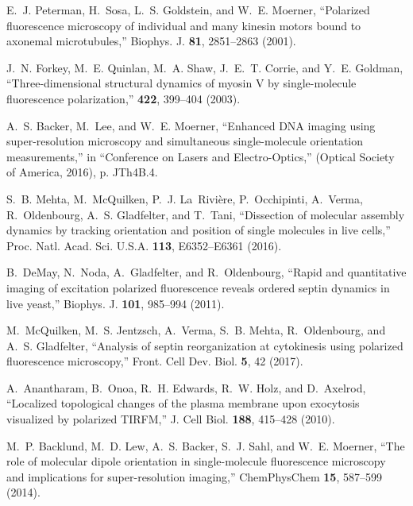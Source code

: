 \documentclass[10pt]{article}
\begin{document}
\begin{thebibliography}{10}
\newcommand{\enquote}[1]{``#1''}

E.~J. Peterman, H.~Sosa, L.~S. Goldstein, and W.~E. Moerner, \enquote{Polarized
  fluorescence microscopy of individual and many kinesin motors bound to
  axonemal microtubules,} Biophys. J. \textbf{81}, 2851--2863 (2001).

J.~N. Forkey, M.~E. Quinlan, M.~A. Shaw, J.~E.~T. Corrie, and Y.~E. Goldman,
  \enquote{Three-dimensional structural dynamics of myosin {V} by
  single-molecule fluorescence polarization,} \nat \textbf{422}, 399--404
  (2003).

A.~S. Backer, M.~Lee, and W.~E. Moerner, \enquote{Enhanced {DNA} imaging using
  super-resolution microscopy and simultaneous single-molecule orientation
  measurements,} in \enquote{Conference on Lasers and Electro-Optics,}
  (Optical Society of America, 2016), p. JTh4B.4.

S.~B. Mehta, M.~McQuilken, P.~J. La~Rivi\`ere, P.~Occhipinti, A.~Verma,
  R.~Oldenbourg, A.~S. Gladfelter, and T.~Tani, \enquote{Dissection of
  molecular assembly dynamics by tracking orientation and position of single
  molecules in live cells,} Proc. Natl. Acad. Sci. U.S.A. \textbf{113},
  E6352--E6361 (2016).

B.~DeMay, N.~Noda, A.~Gladfelter, and R.~Oldenbourg, \enquote{Rapid and
  quantitative imaging of excitation polarized fluorescence reveals ordered
  septin dynamics in live yeast,} Biophys. J. \textbf{101}, 985--994 (2011).

M.~McQuilken, M.~S. Jentzsch, A.~Verma, S.~B. Mehta, R.~Oldenbourg, and A.~S.
  Gladfelter, \enquote{Analysis of septin reorganization at cytokinesis using
  polarized fluorescence microscopy,} Front. Cell Dev. Biol. \textbf{5}, 42
  (2017).

A.~Anantharam, B.~Onoa, R.~H. Edwards, R.~W. Holz, and D.~Axelrod,
  \enquote{Localized topological changes of the plasma membrane upon exocytosis
  visualized by polarized {TIRFM},} J. Cell Biol. \textbf{188}, 415--428
  (2010).

M.~P. Backlund, M.~D. Lew, A.~S. Backer, S.~J. Sahl, and W.~E. Moerner,
  \enquote{The role of molecular dipole orientation in single-molecule
  fluorescence microscopy and implications for super-resolution imaging,}
  ChemPhysChem \textbf{15}, 587--599 (2014).


\end{thebibliography}
\end{document}

